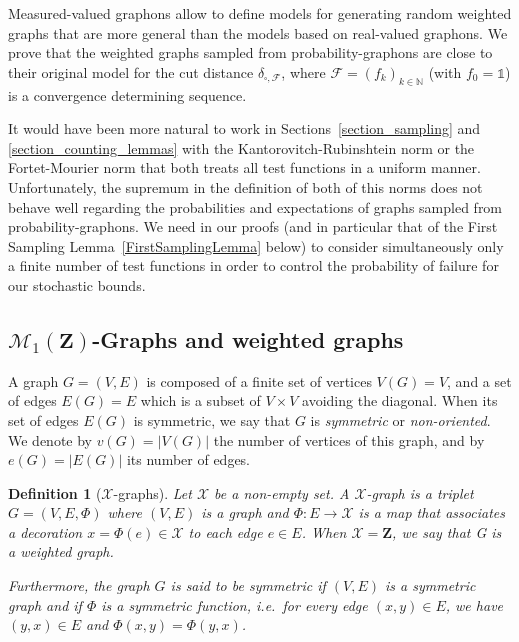 \documentclass{amsart}
\newcommand{\ie}{i.e.\ }
\theoremstyle{plain}
\newtheorem{defin}[Th]{Definition}
\theoremstyle{definition}
\newcommand{\Space}{\mathbf{Z}}
\newcommand{\Proba}{\mathcal{M}_1(\Space)}
\newcommand{\ddcutF}{\delta_{\square,\mathcal{F}}}
\newcommand{\F}{\mathcal{F}}
\newcommand{\un}{\mathds{1}}
\newcommand{\N}{\mathbb{N}}
\begin{document}
Measured-valued graphons allow to define models for generating random weighted graphs
that are more general than the models based on real-valued graphons.
We prove that the weighted graphs sampled from probability-graphons
are close to their original model for the cut distance $\ddcutF$,
where $\F = (f_k)_{k\in\N}$ (with $f_0 = \un$) is a convergence determining sequence.

It would have been more natural to work in 
	Sections~\ref{section_sampling} 
	and \ref{section_counting_lemmas}
with the Kantorovitch-Rubinshtein norm
	or the Fortet-Mourier norm
that both treats all test functions in a uniform manner.
Unfortunately, the supremum in the definition of both
of this norms does not behave well regarding
the probabilities and expectations of graphs
sampled from probability-graphons.
We need in our proofs
(and in particular that of the First Sampling Lemma~\ref{FirstSamplingLemma} below)
to consider simultaneously only a finite number of test functions
in order to control the probability of failure
for our stochastic bounds.


\subsection{\texorpdfstring{$\Proba$}{}-Graphs and weighted graphs}

A graph $G=(V,E)$ is composed of a finite set of vertices $V(G)=V$,
and a set of edges $E(G)=E$ which is a subset of $V\times V$
	avoiding the diagonal.
When its set of edges $E(G)$ is symmetric, we say that $G$ is \emph{symmetric}
or \emph{non-oriented}.
We denote by $v(G)=|V(G)|$ the number of vertices of this graph,
and by $e(G)=|E(G)|$ its number of edges.

\begin{defin}[$\mathcal{X}$-graphs]
Let $\mathcal{X}$ be a non-empty set.
A  \emph{$\mathcal{X}$-graph} 
is a triplet $G=(V,E,\Phi)$ where $(V,E)$ is a graph
and $\Phi: E\to \mathcal{X}$ is a map that associates a decoration $x=\Phi(e)\in \mathcal{X}$ to each edge $e\in E$.
When $\mathcal{X}=\Space$, we say that G is a \emph{weighted graph}.

Furthermore, the graph $G$
is said to be \emph{symmetric}
if $(V,E)$ is a symmetric graph and if $\Phi$ 
is a symmetric  function,
\ie for every edge $(x,y)\in E$, we have $(y,x)\in E$ and $\Phi(x,y) = \Phi(y,x)$.
\end{defin}
\end{document}
